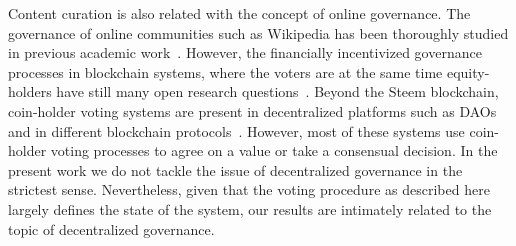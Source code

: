   Content curation is also related with the concept of online governance. The governance of online communities such as Wikipedia has been thoroughly studied in previous academic work~\cite{leskovec2010governance,forte2008scaling}. However, the financially incentivized governance processes in blockchain systems, where the voters are at the same time equity-holders have still many open research questions~\cite{vitalik,ehrsam}.
   Beyond the Steem blockchain, coin-holder voting systems are present in decentralized platforms such as DAOs~\cite{darkdaos} and in different blockchain protocols~\cite{tezos}. However, most of these systems use coin-holder voting processes to agree on a value or take a consensual decision.
    In the present work we do not tackle the issue of decentralized governance in the strictest sense. Nevertheless, given that the voting procedure as described here largely defines the state of the system, our results are intimately related to the topic of decentralized governance.
